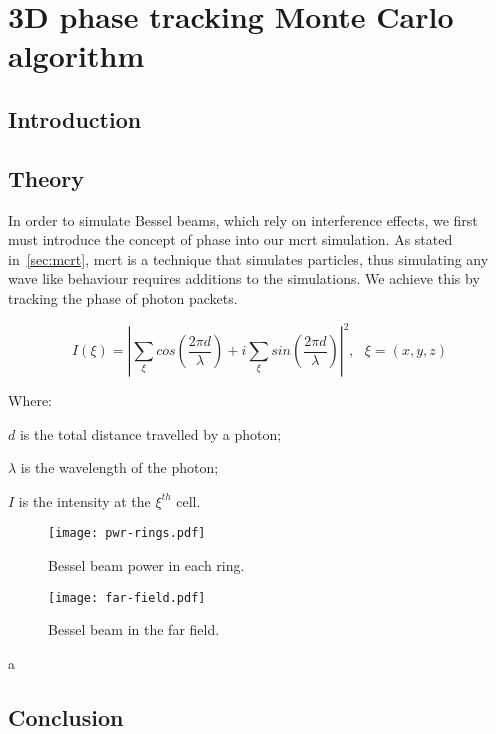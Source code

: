 \chapter{3D phase tracking Monte Carlo algorithm}

\section{Introduction}

\section{Theory}

In order to simulate Bessel beams, which rely on interference effects, we first must introduce the concept of phase into our \gls{mcrt} simulation. As stated in~\cref{sec:mcrt}, \gls{mcrt} is a technique that simulates particles, thus simulating any wave like behaviour requires additions to the simulations. We achieve this by tracking the phase of photon packets. 

\begin{equation}
I(\xi)=\left| \sum\limits_{\xi}cos\left(\frac{2\pi d}{\lambda}\right) + i \sum\limits_{\xi}sin\left(\frac{2\pi d}{\lambda}\right)\right|^2,\ \ \ \xi=(x,y,z)
\end{equation}

\noindent Where:

\indent $d$ is the total distance travelled by a photon;

\indent $\lambda$ is the wavelength of the photon;

\indent $I$ is the intensity at the $\xi^{th}$ cell.

\medskip

\begin{figure}
\centering
\texttt{[image: pwr-rings.pdf]}
\caption{Bessel beam power in each ring.}
\label{fig:pwrring}
\end{figure}

\begin{figure}
\centering
\texttt{[image: far-field.pdf]}
\caption{Bessel beam in the far field.}
\label{fig:farfield}
\end{figure}


a~\cite{mignon2016fractional}
\section{Conclusion}